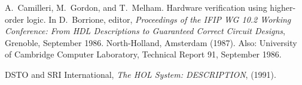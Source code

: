 \begin{thebibliography}{99}

A.~Camilleri, M.~Gordon, and T.~Melham.
\newblock Hardware verification using higher-order logic.
\newblock In D.~Borrione, editor, {\em Proceedings of the {IFIP} {WG} 10.2
  Working Conference: From {HDL} Descriptions to Guaranteed Correct Circuit
  Designs}, Grenoble, September 1986. North-Holland, Amsterdam (1987).
\newblock Also: University of Cambridge Computer Laboratory, Technical Report
  91, September 1986.

{\small DSTO} and {\small SRI} International, 
{\it The HOL System: DESCRIPTION}, (1991).

\end{thebibliography}


